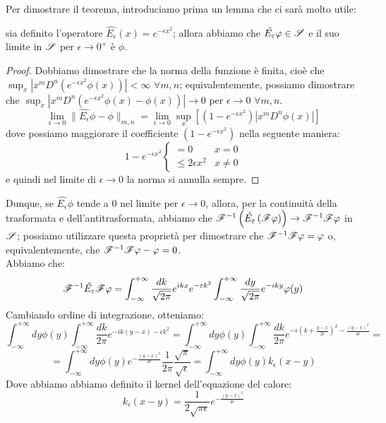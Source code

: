 Per dimostrare il teorema, introduciamo prima un lemma che ci sarà molto utile:
\begin{lemma}
sia definito l'operatore $\hat{E_{\epsilon}} (x)= e^{- \epsilon x^2}$; allora abbiamo che $\hat{E_{\epsilon}} \phi \in \S$ e il suo limite in $\S$ per $\epsilon \to 0^+$ è $\phi$.
\end{lemma}
\begin{proof}
Dobbiamo dimostrare che la norma della funzione è finita, cioè che $\sup_x |x^m D^n (e^{- \epsilon x^2} \phi (x))| < \infty$ $\forall m,n$; equivalentemente, possiamo dimostrare che $\sup_x |x^m D^n (e^{- \epsilon x^2} \phi (x)- \phi(x))| \to 0$ per $\epsilon \to 0$ $\forall m,n$.
$$\lim_{\epsilon \to 0} \| \hat{E_{\epsilon}} \phi - \phi \|_{m,n}= \lim_{\epsilon \to 0} \sup_x \left[ (1-e^{- \epsilon x^2})|x^m D^n  \phi (x)|\right]$$
dove possiamo maggiorare il coefficiente $(1-e^{- \epsilon x^2})$ nella seguente maniera:
$$1-e^{- \epsilon x^2} \left\{\begin{matrix} =0 & x=0 \\ \leq 2 \epsilon x^2 & x \neq 0 \end{matrix} \right.$$
e quindi nel limite di $\epsilon \to 0$ la norma si annulla sempre.
\end{proof}
Dunque, se $\hat{E_{\epsilon}} \phi$ tende a $0$ nel limite per $\epsilon \to 0$, allora, per la continuità della trasformata e dell'antitrasformata, abbiamo che $\F^{-1} \left(\hat{E_{\epsilon}}\left(\F \phi \right) \right) \to \F^{-1} \F \phi$ in $\S$; possiamo utilizzare questa proprietà per dimostrare che $\F^{-1} \F \phi = \phi$ o, equivalentemente, che $\F^{-1} \F \phi - \phi = 0$.\\
Abbiamo che:
$$\F ^{-1} \hat{E_{\epsilon}} \F \phi = \int_{-\infty} ^{+\infty} \frac{dk}{\sqrt{2 \pi}} e^{ikx} e^{-\epsilon k^2} \int_{-\infty} ^{+\infty} \frac{dy}{\sqrt{2 \pi}} e^{-iky} \phi (y)$$
Cambiando ordine di integrazione, otteniamo:
$$\int_{-\infty} ^{+\infty} dy \phi (y) \int_{-\infty} ^{+\infty} \frac{dk}{2 \pi} e^{-ik(y-x) -\epsilon k^2} = \int_{-\infty} ^{+\infty} dy \phi (y) \int_{-\infty} ^{+\infty} \frac{dk}{2 \pi} e^{- \epsilon \left( k + \frac{y-x}{2 \epsilon} \right)^2  -\frac{(y-x)^2}{4 \epsilon}} =$$
$$= \int_{-\infty} ^{+\infty} dy \phi (y) e^{ -\frac{(y-x)^2}{4 \epsilon}} \frac{1}{2 \pi} \frac{\sqrt{\pi}}{\sqrt{\epsilon}} =  \int_{-\infty} ^{+\infty} dy \phi (y) k_{\epsilon} (x-y)$$
Dove abbiamo abbiamo definito il kernel dell'equazione del calore:
$$ k_{\epsilon} (x-y) = \frac{1}{2 \sqrt{ \pi \epsilon}} e^{ -\frac{(y-x)^2}{4 \epsilon}}$$
